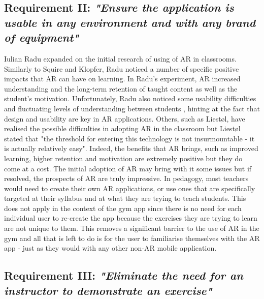 \documentclass{l4proj}
\begin{document}
\subsection{\textbf{Requirement II:} \textit{"Ensure the application is usable in any environment and with any brand of equipment"}}
\label{requirement_II}


Iulian Radu expanded on the initial research of using of AR in classrooms. Similarly to Squire and Klopfer, Radu noticed a number of specific positive impacts that AR can have on learning. In Radu's experiment, AR increased understanding and the long-term retention of taught content as well as the student's motivation\cite{radu_why_2012}. Unfortunately, Radu also noticed some usability difficulties and fluctuating levels of understanding between students \cite{radu_why_2012}, hinting at the fact that design and usability are key in AR applications. Others, such as Liestøl, have realised the possible difficulties in adopting AR in the classroom but Liestøl stated that "the threshold for entering this technology is not insurmountable - it is actually relatively easy"\cite{liestol_learning_2011}. Indeed, the benefits that AR brings, such as improved learning, higher retention and motivation are extremely positive but they do come at a cost. The initial adoption of AR may bring with it some issues but if resolved, the prospects of AR are truly impressive. In pedagogy, most teachers would need to create their own AR applications, or use ones that are specifically targeted at their syllabus and at what they are trying to teach students. This does not apply in the context of the gym app since there is no need for each individual user to re-create the app because the exercises they are trying to learn are not unique to them. This removes a significant barrier to the use of AR in the gym and all that is left to do is for the user to familiarise themselves with the AR app - just as they would with any other non-AR mobile application. 

\subsection{\textbf{Requirement III:} \textit{"Eliminate the need for an instructor to demonstrate an exercise"}}
\label{requirement_III}
\end{document}
